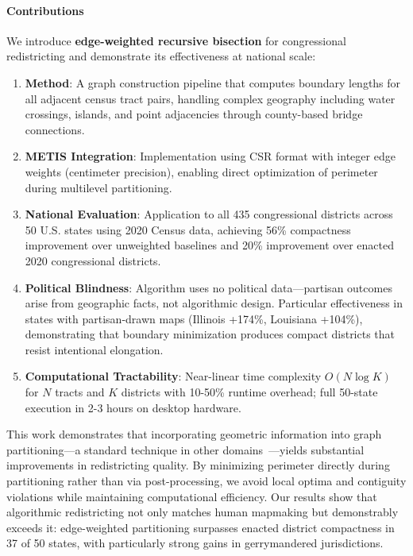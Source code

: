 \paragraph{Contributions} We introduce \textbf{edge-weighted recursive bisection} for congressional redistricting and demonstrate its effectiveness at national scale:

\begin{enumerate}
    \item \textbf{Method}: A graph construction pipeline that computes boundary lengths for all adjacent census tract pairs, handling complex geography including water crossings, islands, and point adjacencies through county-based bridge connections.

    \item \textbf{METIS Integration}: Implementation using CSR format with integer edge weights (centimeter precision), enabling direct optimization of perimeter during multilevel partitioning.

    \item \textbf{National Evaluation}: Application to all 435 congressional districts across 50 U.S. states using 2020 Census data, achieving 56\% compactness improvement over unweighted baselines and 20\% improvement over enacted 2020 congressional districts.

    \item \textbf{Political Blindness}: Algorithm uses no political data—partisan outcomes arise from geographic facts, not algorithmic design. Particular effectiveness in states with partisan-drawn maps (Illinois +174\%, Louisiana +104\%), demonstrating that boundary minimization produces compact districts that resist intentional elongation.

    \item \textbf{Computational Tractability}: Near-linear time complexity $O(N \log K)$ for $N$ tracts and $K$ districts with 10-50\% runtime overhead; full 50-state execution in 2-3 hours on desktop hardware.
\end{enumerate}

This work demonstrates that incorporating geometric information into graph partitioning—a standard technique in other domains~\cite{hendrickson1995graph}—yields substantial improvements in redistricting quality. By minimizing perimeter directly during partitioning rather than via post-processing, we avoid local optima and contiguity violations while maintaining computational efficiency. Our results show that algorithmic redistricting not only matches human mapmaking but demonstrably exceeds it: edge-weighted partitioning surpasses enacted district compactness in 37 of 50 states, with particularly strong gains in gerrymandered jurisdictions.
